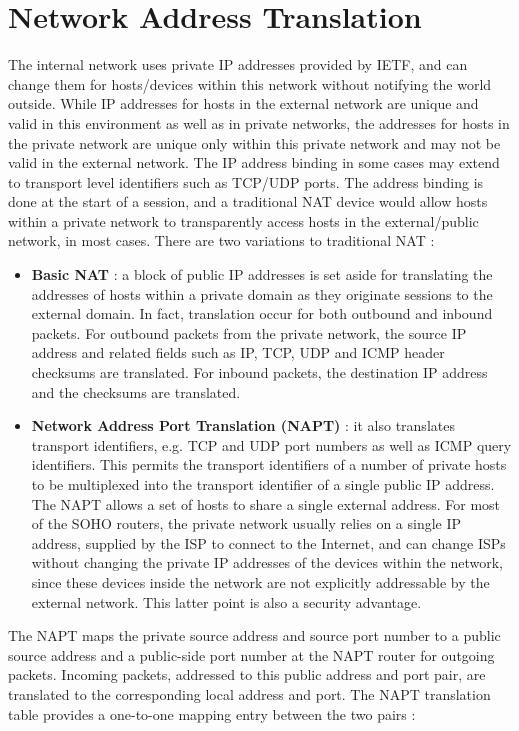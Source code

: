 \documentclass[11pt]{article}
\begin{document}
\section{Network Address Translation}
The internal network uses private IP addresses provided by IETF, and can change them for hosts/devices within this network without notifying the world outside. While IP addresses for hosts in the external network are unique and valid in this environment as well as in private networks, the addresses for hosts in the private network are unique only within this private network and may not be valid in the external network. The IP address binding in some cases may extend to transport level identifiers such as TCP/UDP ports. The address binding is done at the start of a session, and a traditional NAT device would allow hosts within a private network to transparently access hosts in the external/public network, in most cases. There are two variations to traditional NAT : 
\begin{itemize}
\item \textbf{Basic NAT} : a block of public IP addresses is set aside for translating the addresses of hosts within a private domain as they originate sessions to the external domain. In fact, translation occur for both outbound and inbound packets. For outbound packets from the private network, the source IP address and related fields such as IP, TCP, UDP and ICMP header checksums are translated. For inbound packets, the destination IP address and the checksums are translated.
\item \textbf{Network Address Port Translation (NAPT)} : it also translates transport identifiers, e.g. TCP and UDP port numbers as well as ICMP query identifiers. This permits the transport identifiers of a number of private hosts to be multiplexed into the transport identifier of a single public IP address. The NAPT allows a set of hosts to share a single external address. For most of the SOHO routers, the private network usually relies on a single IP address, supplied by the ISP to connect to the Internet, and can change ISPs without changing the private IP addresses of the devices within the network, since these devices inside the network are not explicitly addressable by the external network. This latter point is also a security advantage. 
\end{itemize}
The NAPT maps the private source address and source port number to a public source address and a public-side port number at the NAPT router for outgoing packets. Incoming packets, addressed to this public address and port pair, are translated to the corresponding local address and port. The NAPT translation table provides a one-to-one mapping entry between the two pairs : 
\end{document}

